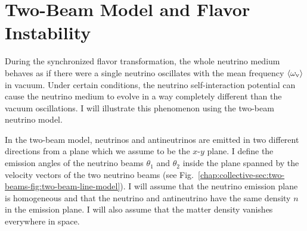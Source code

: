 






\section{\label{chap:collective-sec:two-beams}Two-Beam Model and Flavor Instability}

During the synchronized flavor transformation, the whole neutrino medium behaves as if there were a single neutrino oscillates with the mean frequency $\langle \omega_\mathrm v \rangle$ in vacuum. Under certain conditions, the neutrino self-interaction potential can cause the neutrino medium to evolve in a way completely different than the vacuum oscillations. I will illustrate this phenomenon using the two-beam neutrino model.

In the two-beam model, neutrinos and antineutrinos are emitted in two different directions from a plane which we assume to be the $x$-$y$ plane. I define the emission angles of the neutrino beams $\theta_1$ and $\theta_2$ inside the plane spanned by the velocity vectors of the two neutrino beams (see Fig.~\ref{chap:collective-sec:two-beams-fig:two-beam-line-model}). I will assume that the neutrino emission plane is homogeneous and that the neutrino and antineutrino have the same density $n$ in the emission plane. I will also assume that the matter density vanishes everywhere in space.



